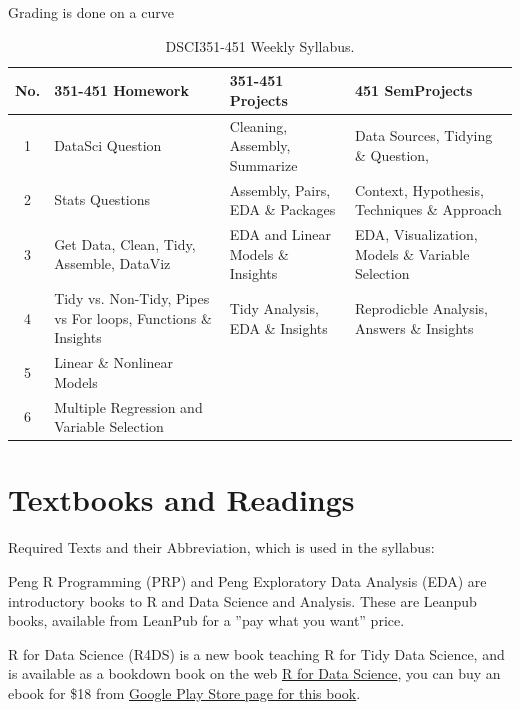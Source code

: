 \documentclass[11pt]{article} %
\begin{document}
  Grading is done on a curve
  
  \begin{table}[h] 
  	\centering %
  	\begin{tabular}{| c | p{4cm} | p{4cm} | p{4cm}|} %
  	\hline %
  	No. & 351-451 Homework & 351-451 Projects & 451 SemProjects \\ %
  	\hline 
  	\hline %
      1 & DataSci Question & Cleaning, Assembly, Summarize & Data Sources, Tidying \& Question, \\ %
  	\hline %
  	2 & Stats Questions & Assembly, Pairs, EDA \& Packages & Context, Hypothesis, 
      Techniques \& Approach  \\ 
  	\hline  
  	3 & Get Data, Clean, Tidy, Assemble, DataViz & EDA and Linear Models \& Insights & EDA, Visualization, Models \& Variable Selection  \\ 
  	\hline
  	 4 &  Tidy vs. Non-Tidy, Pipes vs For loops, Functions \& Insights & Tidy Analysis, EDA \& Insights & Reprodicble Analysis, Answers \& Insights \\
  	\hline 
  	5 &  Linear \& Nonlinear Models & & \\
      \hline 
      6 &  Multiple Regression and Variable Selection & & \\
      \hline 
      \hline
  	
  \end{tabular} 
  \caption{DSCI351-451 Weekly Syllabus.}
  \label{table:Syllabus} %
  \end{table} 

\section{Textbooks and Readings}

  Required Texts and their Abbreviation, which is used in the syllabus:
  
  Peng R Programming (PRP) and Peng Exploratory Data Analysis (EDA) are introductory books to R and Data Science and Analysis. 
  These are  Leanpub books, available from LeanPub for a ”pay what you want” price. 
  
  R for Data Science (R4DS) is a new book teaching R for Tidy Data Science, and is available as a bookdown book on the web \href{http://r4ds.had.co.nz/}{R for Data Science}, you can buy an ebook for \$18 from \href{https://play.google.com/store/books/details/Hadley_Wickham_R_for_Data_Science?id=I6y3DQAAQBAJ}{Google Play Store page for this book}. 
  
\end{document}
